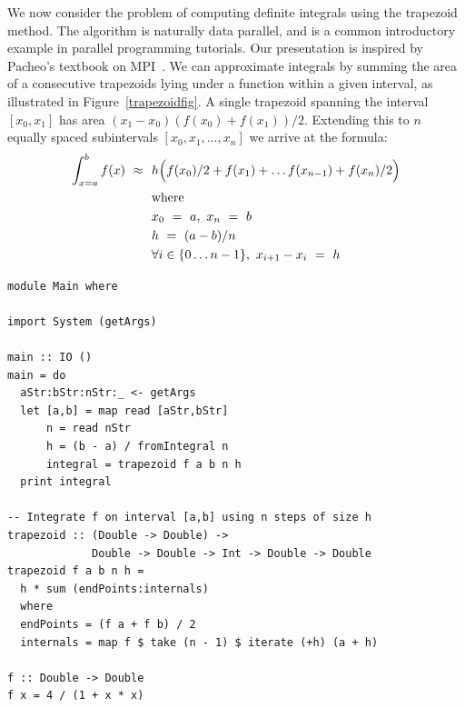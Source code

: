 \documentclass{tmr}
\begin{document}
We now consider the problem of computing definite integrals
using the trapezoid method. The algorithm is naturally data parallel, and is a common
introductory example in parallel programming tutorials. Our presentation is inspired by
Pacheo's textbook on MPI~\cite{Pacheo}.
We can approximate integrals by summing the area of a consecutive
trapezoids lying under a function within a given interval, as illustrated in
Figure~\ref{trapezoidfig}. A single trapezoid spanning the interval
$[x_0,x_1]$ has area $(x_1 - x_0)(f(x_0) + f(x_1))/2$. Extending this to $n$ equally spaced subintervals $[x_0,x_1,\ldots,x_n]$
we arrive at the formula:
\begin{equation*}
\begin{split}
\int_{x=a}^{b} f(x)\ \approx\ &\ h \Bigl(f(x_0)/2 + f(x_1) + \ldots f(x_{n-1}) + f(x_n)/2\Bigr) \\
                     &\ \textrm{where} \\
                     &\ x_0\ =\ a,\ x_n\ =\ b\\
                     &\ h\ =\ (a - b) / n\\
                     &\ \forall i \in \{0 \ldots n-1\},\ x_{i+1} - x_{i}\ =\ h
\end{split}
\end{equation*}

\begin{listing}
\begin{Verbatim}
module Main where

import System (getArgs)

main :: IO ()
main = do
  aStr:bStr:nStr:_ <- getArgs
  let [a,b] = map read [aStr,bStr]
      n = read nStr
      h = (b - a) / fromIntegral n
      integral = trapezoid f a b n h
  print integral 

-- Integrate f on interval [a,b] using n steps of size h
trapezoid :: (Double -> Double) ->
             Double -> Double -> Int -> Double -> Double
trapezoid f a b n h =
  h * sum (endPoints:internals)
  where
  endPoints = (f a + f b) / 2
  internals = map f $ take (n - 1) $ iterate (+h) (a + h)

f :: Double -> Double
f x = 4 / (1 + x * x)
\end{Verbatim}
\end{listing}
\end{document}
